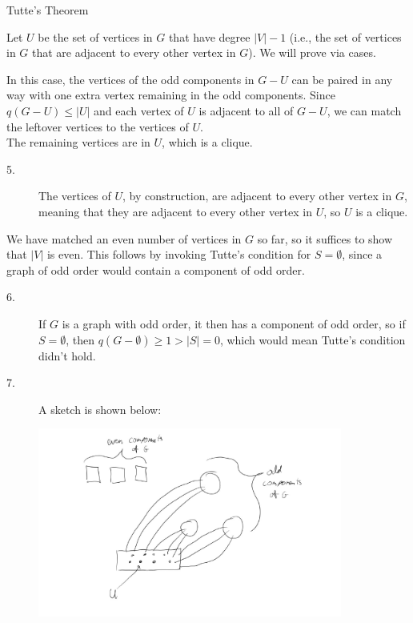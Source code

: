 \documentclass[9pt]{extarticle}
\begin{document}
{\begin{problem}{Tutte's Theorem}
\begin{description}[font=\scshape]
        Let $U$ be the set of vertices in $G$ that have degree $|V|-1$ (i.e., the set of vertices in $G$ that are adjacent to every other vertex in $G$). We will prove via cases.
        \begin{description}[font=\normalfont\scshape]
          \item[Case 1: $G-U$ consists of disjoint complete graphs.] In this case, the vertices of the odd components in $G-U$ can be paired in any way with one extra vertex remaining in the odd components. Since $q(G-U) \leq |U|$ and each vertex of $U$ is adjacent to all of $G-U$, we can match the leftover vertices to the vertices of $U$.\\

            The remaining vertices are in $U$, which is a clique.
            \begin{description}
              \item[5.] The vertices of $U$, by construction, are adjacent to every other vertex in $G$, meaning that they are adjacent to every other vertex in $U$, so $U$ is a clique.
            \end{description}
            We have matched an even number of vertices in $G$ so far, so it suffices to show that $|V|$ is even. This follows by invoking Tutte's condition for $S = \emptyset$, since a graph of odd order would contain a component of odd order.
            \begin{description}
              \item[6.] If $G$ is a graph with odd order, it then has a component of odd order, so if $S = \emptyset$,  then $q(G-\emptyset) \geq 1 > |S| = 0$, which would mean Tutte's condition didn't hold.
              \item[7.]A sketch is shown below:\\
                \begin{center}
                  \includegraphics[width=10cm]{tutte_condition_sketch}

\end{center}
\end{description}
\end{description}
\end{description}
\end{problem}}
\end{document}
